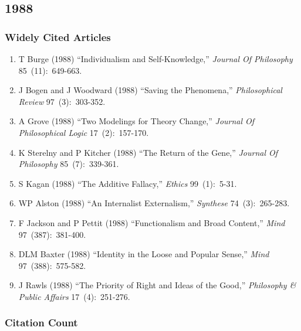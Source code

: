 \documentclass[
  10pt,
  letterpaper,
  DIV=11,
  numbers=noendperiod,
  twoside]{scrartcl}
\providecommand{\tightlist}{%
  \setlength{\itemsep}{0pt}\setlength{\parskip}{0pt}}\usepackage{longtable,booktabs,array}
\begin{document}
\newpage

\subsection{1988}\label{sec-s1988}

\subsubsection*{Widely Cited Articles}\label{widely-cited-articles-32}

\begin{enumerate}
\def\labelenumi{\arabic{enumi}.}
\tightlist
\item
  T Burge (1988) ``Individualism and Self-Knowledge,'' \emph{Journal Of
  Philosophy} 85~(11):~649-663.
\item
  J Bogen and J Woodward (1988) ``Saving the Phenomena,''
  \emph{Philosophical Review} 97~(3):~303-352.
\item
  A Grove (1988) ``Two Modelings for Theory Change,'' \emph{Journal Of
  Philosophical Logic} 17~(2):~157-170.
\item
  K Sterelny and P Kitcher (1988) ``The Return of the Gene,''
  \emph{Journal Of Philosophy} 85~(7):~339-361.
\item
  S Kagan (1988) ``The Additive Fallacy,'' \emph{Ethics} 99~(1):~5-31.
\item
  WP Alston (1988) ``An Internalist Externalism,'' \emph{Synthese}
  74~(3):~265-283.
\item
  F Jackson and P Pettit (1988) ``Functionalism and Broad Content,''
  \emph{Mind} 97~(387):~381-400.
\item
  DLM Baxter (1988) ``Identity in the Loose and Popular Sense,''
  \emph{Mind} 97~(388):~575-582.
\item
  J Rawls (1988) ``The Priority of Right and Ideas of the Good,''
  \emph{Philosophy \& Public Affairs} 17~(4):~251-276.
\end{enumerate}

\subsubsection*{Citation Count}\label{sec-count-1988}
\end{document}
